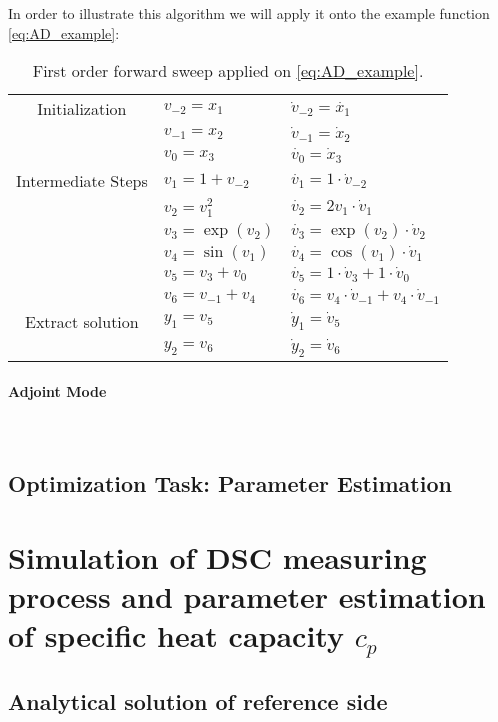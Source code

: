 \documentclass{scrartcl}[12pt, halfparskip]
\begin{document}
In order to illustrate this algorithm we will apply it onto the example function \eqref{eq:AD_example}:

\begin{table}[H]
\centering
\begin{tabular}{| c | l | l |} \hline
	Initialization & $v_{-2} = x_1$ & $\dot{v}_{-2} = \dot{x_1}$ \\
	& $v_{-1} = x_2$ & $\dot{v}_{-1} = \dot{x}_2$ \\
	& $v_{0} = x_3$ & $\dot{v_{0}} = \dot{x}_3$ \\ \hline
	Intermediate Steps & $v_1 = 1+v_{-2}$ & $\dot{v_1} = 1 \cdot \dot{v}_{-2}$ \\
	& $v_2 = v_{1}^2$ & $\dot{v_2} = 2 v_1 \cdot \dot{v}_{1}$ \\
    & $v_3 = \exp(v_{2})$ & $\dot{v_3} = \exp(v_2) \cdot \dot{v}_{2}$ \\
    & $v_4 = \sin(v_{1})$ & $\dot{v_4} = \cos(v_1) \cdot \dot{v}_{1}$ \\
	& $v_{5} = v_3 + v_0$ & $\dot{v_{5}} = 1 \cdot \dot{v}_3 + 1 \cdot \dot{v}_0$ \\
	& $v_{6} = v_{-1} + v_4$ & $\dot{v_{6}} = v_4 \cdot \dot{v}_{-1} + v_4 \cdot \dot{v}_{-1}$ \\ \hline
	Extract  solution & $y_1 = v_5$ & $\dot{y}_1 = \dot{v}_5$ \\
	& $y_2 = v_6$ & $\dot{y}_2 = \dot{v}_6$ \\ \hline
\end{tabular}
\caption{First order forward sweep applied on \eqref{eq:AD_example}.}
\end{table}




\paragraph{Adjoint Mode}\mbox{}\\



\subsection{Optimization Task: Parameter Estimation}


\newpage
\section{Simulation of DSC measuring process and parameter estimation of specific heat capacity $c_p$}
\subsection{Analytical solution of reference side}
\end{document}
